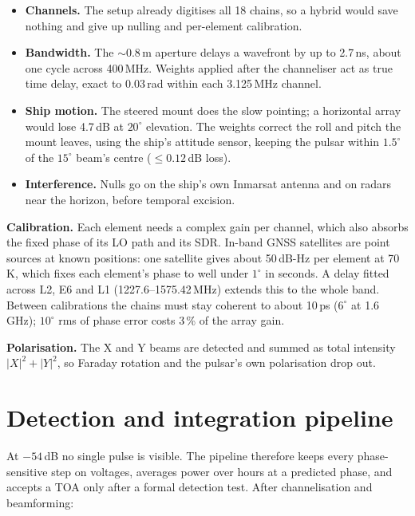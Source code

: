 \documentclass[11pt,a4paper]{article}
\begin{document}
\begin{itemize}
\item \textbf{Channels.} The setup already digitises all 18 chains, so a hybrid would save nothing and
  give up nulling and per-element calibration.
\item \textbf{Bandwidth.} The $\sim$0.8\,m aperture delays a wavefront by up to 2.7\,ns, about one cycle
  across 400\,MHz. Weights applied after the channeliser act as true time delay, exact to 0.03\,rad
  within each 3.125\,MHz channel.
\item \textbf{Ship motion.} The steered mount does the slow pointing; a horizontal array would lose
  4.7\,dB at $20^\circ$ elevation. The weights correct the roll and pitch the mount leaves, using the
  ship's attitude sensor, keeping the pulsar within $1.5^\circ$ of the $15^\circ$ beam's centre
  ($\le 0.12$\,dB loss).
\item \textbf{Interference.} Nulls go on the ship's own Inmarsat antenna and on radars near the horizon,
  before temporal excision.
\end{itemize}

\textbf{Calibration.} Each element needs a complex gain per channel, which also absorbs the fixed phase
of its LO path and its SDR. In-band GNSS satellites are point sources at known positions: one satellite
gives about 50\,dB-Hz per element at 70\,K, which fixes each element's phase to well under $1^\circ$ in
seconds. A delay fitted across L2, E6 and L1 (1227.6--1575.42\,MHz) extends this to the whole band.
Between calibrations the chains must stay coherent to about 10\,ps ($6^\circ$ at 1.6\,GHz); $10^\circ$
rms of phase error costs 3\,\% of the array gain.

\textbf{Polarisation.} The X and Y beams are detected and summed as total intensity $|X|^2 + |Y|^2$, so
Faraday rotation and the pulsar's own polarisation drop out.

\section{Detection and integration pipeline}

At $-54$\,dB no single pulse is visible. The pipeline therefore keeps every phase-sensitive step on
voltages, averages power over hours at a predicted phase, and accepts a TOA only after a formal
detection test. After channelisation and beamforming:
\end{document}
